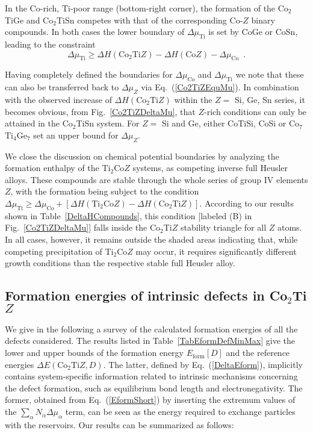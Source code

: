 \documentclass[aps,prb,twocolumn,superscriptaddress,showpacs]{revtex4}
\newcommand{\FG}[1]{Fig.~\ref{#1}}
\newcommand{\EQ}[1]{Eq.~(\ref{#1})}
\newcommand{\bm}[1]{\mbox{\boldmath$#1$}}
\begin{document}
In the Co-rich, Ti-poor range (bottom-right corner), the
formation of the Co$_2$TiGe and Co$_2$TiSn competes with that of
the corresponding Co-$Z$ binary compounds. 
In both cases the lower boundary of $\Delta\mu_\text{Ti}$
is set by CoGe or CoSn, leading to the constraint
\begin{equation}
  \label{DMuCoDMuTiDown}
    \Delta\mu_\text{Ti} \geq
    \Delta H(\text{Co}_2\text{Ti}Z) - 
    \Delta H(\text{Co}Z)  -\Delta\mu_\text{Co}\enspace.
\end{equation}

Having completely defined the boundaries for 
$\Delta\mu_\text{Co}$ and $\Delta\mu_\text{Ti}$ we note that
these can also be transferred back to $\Delta\mu_Z$ via 
\EQ{Co2TiZEquMu}. In combination with the observed increase 
of $\Delta H(\text{Co}_2\text{Ti}Z)$ within the $Z=$ Si, Ge, Sn 
series, it becomes obvious, from \FG{Co2TiZDeltaMu},
that $Z$-rich conditions can only be attained 
in the Co$_2$TiSn system.
For $Z=$ Si and Ge, either CoTiSi, CoSi or Co$_7$Ti$_4$Ge$_7$ set an
upper bound for $\Delta\mu_Z$.

We close the discussion on chemical potential
boundaries by analyzing the 
formation enthalpy of the Ti$_2$Co$Z$ systems,
as competing inverse full Heusler alloys.
These compounds are stable through the
whole series of group IV elements $Z$,
with the formation being subject to the condition 
$\Delta\mu_\text{Ti}\geq\Delta\mu_\text{Co}+
[\Delta H(\text{Ti}_2\text{Co}Z)-\Delta
H(\text{Co}_2\text{Ti}Z)]$. According to our results
shown in Table~\ref{DeltaHCompounds}, this condition 
[labeled (B) in \FG{Co2TiZDeltaMu}] 
falls inside the Co$_2$Ti$Z$ stability triangle
for all $Z$ atoms. In all cases, however, it
remains outside the shaded areas
indicating that, while competing precipitation of
Ti$_2$Co$Z$ may occur,
it requires significantly different growth conditions
than the respective stable full Heusler alloy.

\subsection{Formation energies of intrinsic defects 
               in Co\bm{_2}Ti\bm{Z}}

We give in the following a survey of the calculated formation energies
of all the defects considered. The results listed in
Table~\ref{TabEformDefMinMax} give the
lower and upper bounds of the formation energy 
$E_\text{form}[D]$ and the reference energies
$\Delta E(\text{Co}_2\text{Ti}Z,D)$.
The latter, defined by \EQ{DeltaEform},
implicitly contains system-specific information
related to intrinsic mechanisms concerning the
defect formation, such as equilibrium bond length and
electronegativity. The former, obtained
from \EQ{EformShort} by inserting 
the extremum values of the $\sum_\alpha N_\alpha\Delta\mu_\alpha$
term, can be seen as the energy required to exchange particles 
with the reservoirs.\cite{SDM16} Our results can be summarized as follows:
\end{document}
